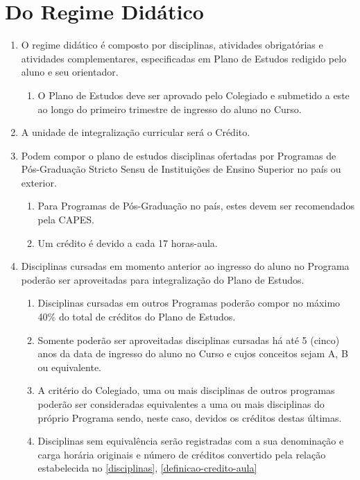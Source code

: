 \documentclass{article}
\newcommand{\singleitem}{\item[Parágrafo Único.]}
\newcommand{\grupoMenor}{Colegiado\xspace}
\begin{document}
\section{Do Regime Didático}
\begin{enumerate}
	\item O regime didático é composto por disciplinas, atividades obrigatórias e atividades complementares, especificadas em Plano de Estudos redigido pelo aluno e seu orientador.
	\begin{enumerate}
		\singleitem O Plano de Estudos deve ser aprovado pelo \grupoMenor e submetido a este ao longo do primeiro trimestre de ingresso do aluno no Curso.
	\end{enumerate}

	\item A unidade de integralização curricular será o Crédito.

	\item \label{disciplinas} Podem compor o plano de estudos disciplinas ofertadas por Programas de Pós-Graduação Stricto Sensu de Instituições de Ensino Superior no país ou exterior.
	\begin{enumerate}
		\item Para Programas de Pós-Graduação no país, estes devem ser recomendados pela CAPES.
		\item \label{definicao-credito-aula} Um crédito é devido a cada 17 horas-aula.
	\end{enumerate}

	\item Disciplinas cursadas em momento anterior ao ingresso do aluno no Programa poderão ser aproveitadas para integralização do Plano de Estudos.
	\begin{enumerate}
		\item Disciplinas cursadas em outros Programas poderão compor no máximo 40\% do total de créditos do Plano de Estudos.
		\item Somente poderão ser aproveitadas disciplinas cursadas há até 5 (cinco) anos da data de ingresso do aluno no Curso e cujos conceitos sejam A, B ou equivalente.
		\item A critério do \grupoMenor, uma ou mais disciplinas de outros programas poderão ser consideradas equivalentes a uma ou mais disciplinas do próprio Programa sendo, neste caso, devidos os créditos destas últimas.
		\item Disciplinas sem equivalência serão registradas com a sua denominação e carga horária originais e número de créditos convertido pela relação estabelecida no \ref{disciplinas}, \ref{definicao-credito-aula}
	\end{enumerate}


\end{enumerate}
\end{document}
